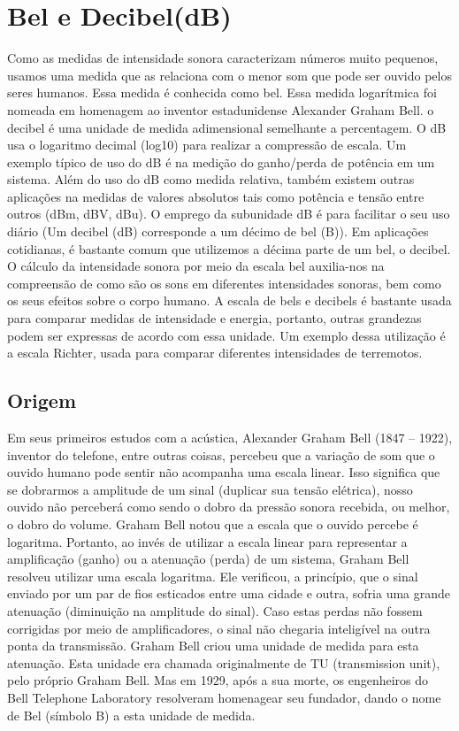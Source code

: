 \documentclass[
	article,			%
	11pt,				%
	oneside,			%
	a4paper,			%
	english,			%
	brazil,				%
	sumario=tradicional
	]{abntex2}
\begin{document}
\section{Bel e Decibel(dB)}
Como as medidas de intensidade sonora caracterizam números muito pequenos, usamos uma medida que as relaciona com o menor som que pode ser ouvido pelos seres humanos. Essa medida é conhecida como bel. Essa medida logarítmica foi nomeada em homenagem ao inventor estadunidense Alexander Graham Bell.
o decibel é uma unidade de medida adimensional semelhante a percentagem. O dB usa o logaritmo decimal (log10) para realizar a compressão de escala. Um exemplo típico de uso do dB é na medição do ganho/perda de potência em um sistema. Além do uso do dB como medida relativa, também existem outras aplicações na medidas de valores absolutos tais como potência e tensão entre outros (dBm, dBV, dBu). O emprego da subunidade dB é para facilitar o seu uso diário (Um decibel (dB) corresponde a um décimo de bel (B)).
Em aplicações cotidianas, é bastante comum que utilizemos a décima parte de um bel, o decibel. O cálculo da intensidade sonora por meio da escala bel auxilia-nos na compreensão de como são os sons em diferentes intensidades sonoras, bem como os seus efeitos sobre o corpo humano.
A escala de bels e decibels é bastante usada para comparar medidas de intensidade e energia, portanto, outras grandezas podem ser expressas de acordo com essa unidade. Um exemplo dessa utilização é a escala Richter, usada para comparar diferentes intensidades de terremotos.
\begin{center}

\end{center}
\subsection{Origem}
Em seus primeiros estudos com a acústica, Alexander Graham Bell (1847 – 1922), inventor do telefone, entre outras coisas, percebeu que a variação de som que o ouvido humano pode sentir não acompanha uma escala linear.
Isso significa que se dobrarmos a amplitude de um sinal (duplicar sua tensão elétrica), nosso ouvido não perceberá como sendo o dobro da pressão sonora recebida, ou melhor, o dobro do volume.
Graham Bell notou que a escala que o ouvido percebe é logaritma.
Portanto, ao invés de utilizar a escala linear para representar a amplificação (ganho) ou a atenuação (perda) de um sistema, Graham Bell resolveu utilizar uma escala logaritma.
Ele verificou, a princípio, que o sinal enviado por um par de fios esticados entre uma cidade e outra, sofria uma grande atenuação (diminuição na amplitude do sinal).
Caso estas perdas não fossem corrigidas por meio de amplificadores, o sinal não chegaria inteligível na outra ponta da transmissão.
Graham Bell criou uma unidade de medida para esta atenuação. Esta unidade era chamada originalmente de TU (transmission unit), pelo próprio Graham Bell.
Mas em 1929, após a sua morte, os engenheiros do Bell Telephone Laboratory resolveram homenagear seu fundador, dando o nome de Bel (símbolo B) a esta unidade de medida.
\end{document}

